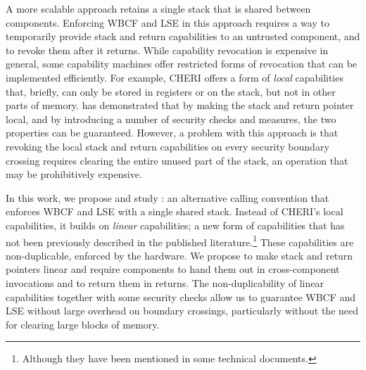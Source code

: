 \documentclass[acmsmall,review,anonymous]{acmart}\settopmatter{printfolios=true,printccs=false,printacmref=false}
\begin{document}
A more scalable approach retains a single stack that is shared between components.
Enforcing WBCF and LSE in this approach requires a way to temporarily provide stack and return capabilities to an untrusted component, and to revoke them after it returns.
While capability revocation is expensive in general, some capability machines offer restricted forms of revocation that can be implemented efficiently.
For example, CHERI offers a form of {\itshape local} capabilities that, briefly, can only be stored in registers or on the stack, but not in other parts of memory.
\citet{skorstengaard_reasoning_2017} has demonstrated that by making the stack and return pointer local, and by introducing a number of security checks and measures, the two properties can be guaranteed.
However, a problem with this approach is that revoking the local stack and return capabilities on every security boundary crossing requires clearing the entire unused part of the stack, an operation that may be prohibitively expensive.

In this work, we propose and study \stktokens{}: an alternative calling convention that enforces WBCF and LSE with a single shared stack.
Instead of CHERI's local capabilities, it builds on {\itshape linear} capabilities; a new form of capabilities that has not been previously described in the published literature.\footnote{Although they have been mentioned in some technical documents.}
These capabilities are non-duplicable, enforced by the hardware.
We propose to make stack and return pointers linear and require components to hand them out in cross-component invocations and to return them in returns.
The non-duplicability of linear capabilities together with some security checks allow us to guarantee WBCF and LSE without large overhead on boundary crossings, particularly without the need for clearing large blocks of memory.
\end{document}
